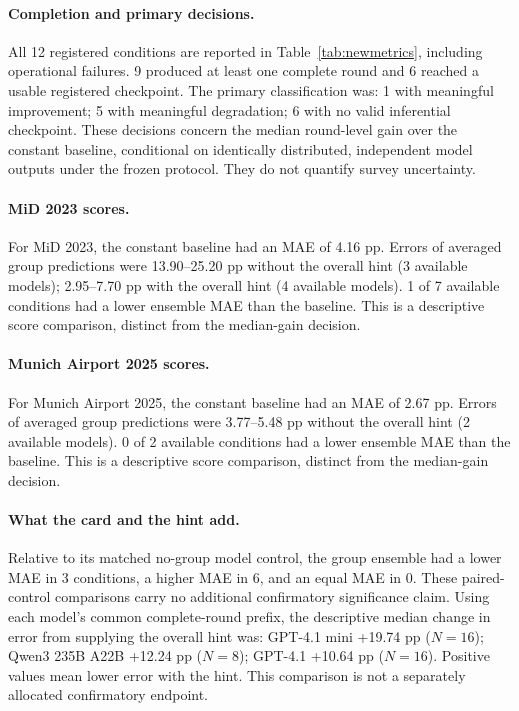 \paragraph{Completion and primary decisions.} All 12 registered conditions are reported in Table~\ref{tab:newmetrics}, including operational failures. 9 produced at least one complete round and 6 reached a usable registered checkpoint. The primary classification was: 1 with meaningful improvement; 5 with meaningful degradation; 6 with no valid inferential checkpoint. These decisions concern the median round-level gain over the constant baseline, conditional on identically distributed, independent model outputs under the frozen protocol. They do not quantify survey uncertainty.

\paragraph{MiD 2023 scores.} For MiD 2023, the constant baseline had an MAE of 4.16 pp. Errors of averaged group predictions were 13.90--25.20 pp without the overall hint (3 available models); 2.95--7.70 pp with the overall hint (4 available models). 1 of 7 available conditions had a lower ensemble MAE than the baseline. This is a descriptive score comparison, distinct from the median-gain decision.

\paragraph{Munich Airport 2025 scores.} For Munich Airport 2025, the constant baseline had an MAE of 2.67 pp. Errors of averaged group predictions were 3.77--5.48 pp without the overall hint (2 available models). 0 of 2 available conditions had a lower ensemble MAE than the baseline. This is a descriptive score comparison, distinct from the median-gain decision.

\paragraph{What the card and the hint add.} Relative to its matched no-group model control, the group ensemble had a lower MAE in 3 conditions, a higher MAE in 6, and an equal MAE in 0. These paired-control comparisons carry no additional confirmatory significance claim. Using each model's common complete-round prefix, the descriptive median change in error from supplying the overall hint was: GPT-4.1 mini +19.74 pp ($N=16$); Qwen3 235B A22B +12.24 pp ($N=8$); GPT-4.1 +10.64 pp ($N=16$). Positive values mean lower error with the hint. This comparison is not a separately allocated confirmatory endpoint.

